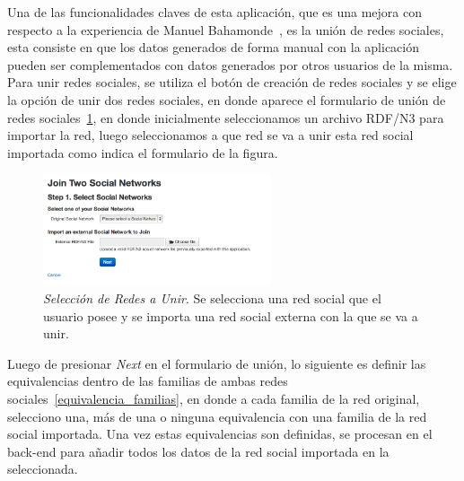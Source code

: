 Una de las funcionalidades claves de esta aplicación, que es una mejora con respecto a la experiencia de Manuel Bahamonde~\cite{memoriamanuel}, es la unión de redes sociales, esta consiste en que los datos generados de forma manual con la aplicación pueden ser complementados con datos generados por otros usuarios de la misma.\\

Para unir redes sociales, se utiliza el botón de creación de redes sociales y se elige la opción de unir dos redes sociales, en donde aparece el formulario de unión de redes sociales~\ref{seleccion_union}, en donde inicialmente seleccionamos un archivo RDF/N3 para importar la red, luego seleccionamos a que red se va a unir esta red social importada como indica el formulario de la figura.\\

\begin{figure}[H]
  \centering
  \includegraphics[width=0.6\textwidth]{images/seleccion_union.png}
  \caption[Selección de Redes a Unir]{\emph{Selección de Redes a Unir}. Se selecciona una red social que el usuario posee y se importa una red social externa con la que se va a unir.}
  \label{seleccion_union}
\end{figure}

Luego de presionar \emph{Next} en el formulario de unión, lo siguiente es definir las equivalencias dentro de las familias de ambas redes sociales~\ref{equivalencia_familias}, en donde a cada familia de la red original, selecciono una, más de una o ninguna equivalencia con una familia de la red social importada. Una vez estas equivalencias son definidas, se procesan en el back-end para añadir todos los datos de la red social importada en la seleccionada.\\

